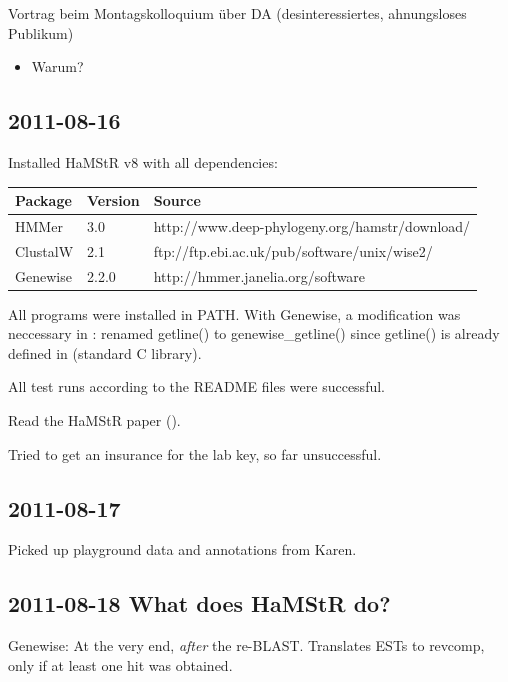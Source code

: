 Vortrag beim Montagskolloquium über DA (desinteressiertes, ahnungsloses
Publikum)

\begin{itemize}
	\item Warum?
\end{itemize}

\subsection*{2011-08-16}

Installed HaMStR v8 with all dependencies:

\begin{table}[h]
	\begin{tabular}{l l l}
		\textbf{Package} & \textbf{Version} & \textbf{Source}\\
		\hline
		HMMer    & 3.0	 & http://www.deep-phylogeny.org/hamstr/download/ \\
		ClustalW & 2.1   & ftp://ftp.ebi.ac.uk/pub/software/unix/wise2/ \\
		Genewise & 2.2.0 & http://hmmer.janelia.org/software \\
	\end{tabular}
\end{table}

All programs were installed in PATH. With Genewise, a modification was
neccessary in : renamed getline() to genewise\_getline()
since getline() is already defined in  (standard C library).

All test runs according to the README files were successful.

Read the HaMStR paper (\cite{Ebersberger2009}).

Tried to get an insurance for the lab key, so far unsuccessful.

\subsection*{2011-08-17}

Picked up playground data and annotations from Karen.

\subsection*{2011-08-18 What does HaMStR do?}

Genewise: At the very end, \emph{after} the re-BLAST. Translates ESTs to
revcomp, only if at least one hit was obtained.

